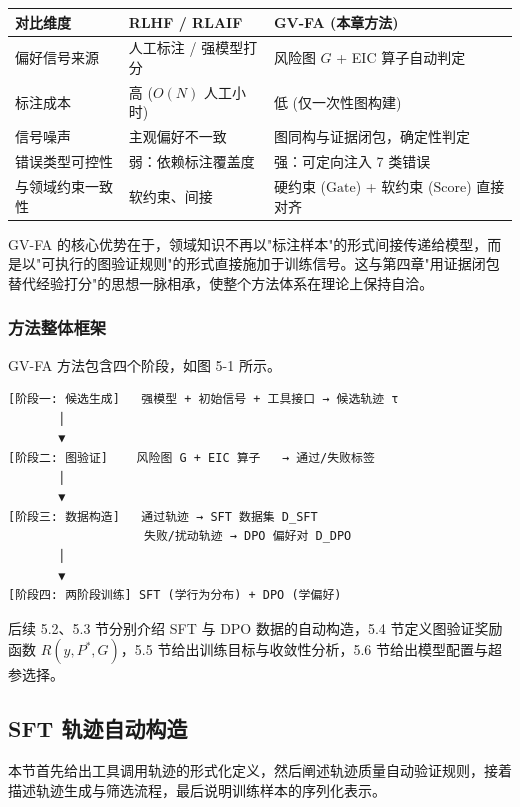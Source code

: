 \documentclass[a4paper,12pt]{ctexart}
\begin{document}
\begin{table}[htbp]
\centering
\small
\setlength{\tabcolsep}{4pt}
\begin{tabular}{|l|l|l|}
\hline
\textbf{对比维度} & \textbf{RLHF / RLAIF} & \textbf{GV-FA (本章方法)} \\
\hline
偏好信号来源 & 人工标注 / 强模型打分 & 风险图 $G$ + EIC 算子自动判定 \\
\hline
标注成本 & 高 ($O(N)$ 人工小时) & 低 (仅一次性图构建) \\
\hline
信号噪声 & 主观偏好不一致 & 图同构与证据闭包，确定性判定 \\
\hline
错误类型可控性 & 弱：依赖标注覆盖度 & 强：可定向注入 7 类错误 \\
\hline
与领域约束一致性 & 软约束、间接 & 硬约束 ($\mathrm{Gate}$) + 软约束 ($\mathrm{Score}$) 直接对齐 \\
\hline
\end{tabular}
\end{table}

GV-FA 的核心优势在于，领域知识不再以"标注样本"的形式间接传递给模型，而是以"可执行的图验证规则"的形式直接施加于训练信号。这与第四章"用证据闭包替代经验打分"的思想一脉相承，使整个方法体系在理论上保持自洽。

\subsubsection{方法整体框架}

GV-FA 方法包含四个阶段，如图 5-1 所示。

\begin{verbatim}
[阶段一: 候选生成]   强模型 + 初始信号 + 工具接口 → 候选轨迹 τ
       │
       ▼
[阶段二: 图验证]    风险图 G + EIC 算子   → 通过/失败标签
       │
       ▼
[阶段三: 数据构造]   通过轨迹 → SFT 数据集 D_SFT
                   失败/扰动轨迹 → DPO 偏好对 D_DPO
       │
       ▼
[阶段四: 两阶段训练] SFT (学行为分布) + DPO (学偏好)
\end{verbatim}

后续 5.2、5.3 节分别介绍 SFT 与 DPO 数据的自动构造，5.4 节定义图验证奖励函数 $R(y,P^*,G)$，5.5 节给出训练目标与收敛性分析，5.6 节给出模型配置与超参选择。

\subsection{SFT 轨迹自动构造}

本节首先给出工具调用轨迹的形式化定义，然后阐述轨迹质量自动验证规则，接着描述轨迹生成与筛选流程，最后说明训练样本的序列化表示。
\end{document}

